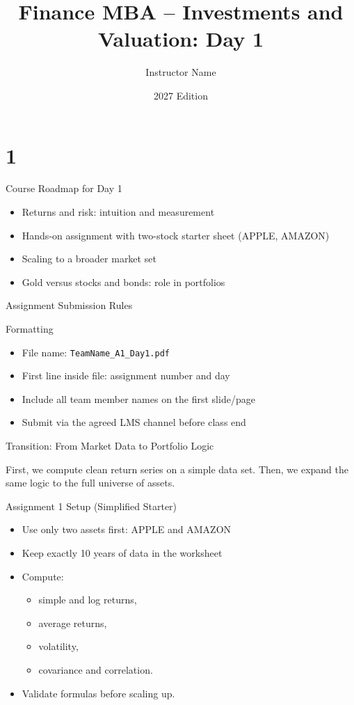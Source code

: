 \documentclass[aspectratio=169]{beamer}
\title[Investments Day 1]{Finance MBA -- Investments and Valuation: Day 1}
\author{Instructor Name}
\date{2027 Edition}
\begin{document}
\begin{frame}
  \titlepage
\end{frame}

\section{1}

\begin{frame}{Course Roadmap for Day 1}
\begin{itemize}
  \item Returns and risk: intuition and measurement
  \item Hands-on assignment with two-stock starter sheet (APPLE, AMAZON)
  \item Scaling to a broader market set
  \item Gold versus stocks and bonds: role in portfolios
\end{itemize}
\end{frame}

\begin{frame}{Assignment Submission Rules}
\begin{assignmentblock}{Formatting}
\begin{itemize}
  \item File name: \texttt{TeamName\_A1\_Day1.pdf}
  \item First line inside file: assignment number and day
  \item Include all team member names on the first slide/page
  \item Submit via the agreed LMS channel before class end
\end{itemize}
\end{assignmentblock}
\end{frame}

\begin{frame}{Transition: From Market Data to Portfolio Logic}
\begin{takeawayblock}
First, we compute clean return series on a simple data set. Then, we expand the same logic to the full universe of assets.
\end{takeawayblock}
\end{frame}

\begin{frame}{Assignment 1 Setup (Simplified Starter)}
\begin{itemize}
  \item Use only two assets first: APPLE and AMAZON
  \item Keep exactly 10 years of data in the worksheet
  \item Compute:
    \begin{itemize}
      \item simple and log returns,
      \item average returns,
      \item volatility,
      \item covariance and correlation.
    \end{itemize}
  \item Validate formulas before scaling up.
\end{itemize}
\end{frame}
\end{document}
